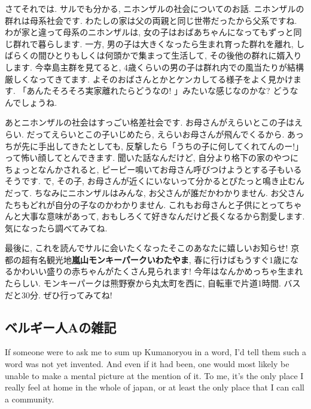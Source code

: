 \documentclass[10pt,b5jsbook,dvips,dvipdfmx,openany]{jsbook}
\theoremstyle{definition}
\begin{document}
		さてそれでは. サルでも分かる, ニホンザルの社会についてのお話. ニホンザルの群れは母系社会です. わたしの家は父の両親と同じ世帯だったから父系ですね. わが家と違って母系のニホンザルは, 女の子はおばあちゃんになってもずっと同じ群れで暮らします. 一方, 男の子は大きくなったら生まれ育った群れを離れ, しばらくの間ひとりもしくは何頭かで集まって生活して, その後他の群れに婿入りします. 今幸島主群を見てると, 4歳くらいの男の子は群れ内での風当たりが結構厳しくなってきてます. よそのおばさんとかとケンカしてる様子をよく見かけます. 「あんたそろそろ実家離れたらどうなの! 」みたいな感じなのかな? どうなんでしょうね.

		あとニホンザルの社会はすっごい格差社会です. お母さんがえらいとこの子はえらい. だってえらいとこの子いじめたら, えらいお母さんが飛んでくるから. あっちが先に手出してきたとしても, 反撃したら「うちの子に何してくれてんのー!」って怖い顔してとんできます. 聞いた話なんだけど, 自分より格下の家のやつにちょっとなんかされると, ピーピー鳴いてお母さん呼びつけようとする子もいるそうです. で, その子, お母さんが近くにいないって分かるとぴたっと鳴き止むんだって. ちなみにニホンザルはみんな, お父さんが誰だかわかりません. お父さんたちもどれが自分の子なのかわかりません. これもお母さんと子供にとってちゃんと大事な意味があって, おもしろくて好きなんだけど長くなるから割愛します. 気になったら調べてみてね.

		最後に, これを読んでサルに会いたくなったそこのあなたに嬉しいお知らせ! 京都の超有名観光地\textbf{嵐山モンキーパークいわたやま}, 春に行けばもうすぐ1歳になるかわいい盛りの赤ちゃんがたくさん見られます! 今年はなんかめっちゃ生まれたらしい. モンキーパークは熊野寮から丸太町を西に, 自転車で片道1時間. バスだと30分. ぜひ行ってみてね!


		\subsection{ベルギー人Aの雑記} %
		If someone were to ask me to sum up Kumanoryou in a word, I'd tell them such a word was not yet invented. And even if it had been, one would most likely be unable to make a mental picture at the mention of it. To me, it's the only place I really feel at home in the whole of japan, or at least the only place that I can call a community.
\end{document}
